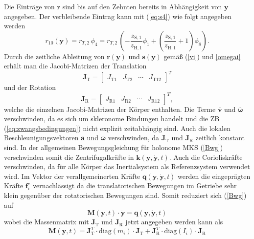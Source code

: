 Die Einträge von $\pmb{r}$ sind bis auf den Zehnten bereits in Abhängigkeit von $\pmb{y}$ angegeben. Der verbleibende Eintrag kann mit (\ref{eq:s4}) wie folgt angegeben werden
\begin{equation}
r_{10}(\pmb{y}) = r_{T,2}\,\phi_4 = r_{T,2}\,\left(-\frac{z_{\mathrm{S,1}} }{z_{\mathrm{H,1}} } \phi_1 +\left(\frac{z_{\mathrm{S,1}} }{z_{\mathrm{H,1}} }+1\right) \phi_8\right).
\end{equation}
Durch die zeitliche Ableitung von $\pmb{r}(\pmb{y})$ und $\pmb{s}(\pmb{y})$ gemäß (\ref{vi}) und \ref{omegai} erhält man die Jacobi-Matrizen der Translation
\begin{equation}
\pmb{J}_\mathrm{T} = \begin{bmatrix}
J_\mathrm{T1} & J_\mathrm{T2} & \cdots & J_\mathrm{T12}
\end{bmatrix}^T
\end{equation}  
und der Rotation 
\begin{equation}
\pmb{J}_\mathrm{R} = \begin{bmatrix}
J_\mathrm{R1} & J_\mathrm{R2} & \cdots & J_\mathrm{R12}
\end{bmatrix}^T,
\end{equation} 
welche die einzelnen Jacobi-Matrizen der Körper enthalten. Die Terme $\overline{\pmb{v}}$ und $\overline{\pmb{\omega}}$ verschwinden, da es sich um skleronome Bindungen handelt und die ZB (\ref{eq:zwangsbedingungen}) nicht explizit zeitabhängig sind. Auch die lokalen Beschleunigungsvektoren $\overline{\pmb{a}}$ und $\overline{\pmb{\omega}}$ verschwinden, da $\pmb{J}_\mathrm{T}$ und $\pmb{J}_\mathrm{R}$ zeitlich konstant sind. In der allgemeinen Bewegungsgleichung für holonome MKS (\ref{Bwg}) verschwinden somit die Zentrifugalkräfte in $\pmb{k}(\pmb{y},\dot{\pmb{y}},t)$. Auch die Corioliskräfte verschwinden, da für alle Körper das Inertialsystem als Referenzsystem verwendet wird.%
 Im Vektor der verallgemeinerten Kräfte $\pmb{q}(\pmb{y},\dot{\pmb{y}},t)$ werden die eingeprägten Kräfte $\pmb{f}^e_i$ vernachlässigt da die translatorischen Bewegungen im Getriebe sehr klein gegenüber der rotatorischen Bewegungen sind. Somit reduziert sich (\ref{Bwg}) auf
\begin{equation}
\pmb{M}(\pmb{y},t)\cdot\ddot{\pmb{y}} = \pmb{q}(\pmb{y},\dot{\pmb{y}},t)
\end{equation}
wobei die Massenmatrix mit $\pmb{J}_\mathrm{T}$ und $\pmb{J}_\mathrm{R}$ jetzt angegeben werden kann als 
  \begin{equation}
\pmb{M}(\pmb{y},t) = \pmb{J}_\mathrm{T}^T\cdot\mathrm{diag}(m_i)\cdot\pmb{J}_\mathrm{T}+\pmb{J}_\mathrm{R}^T\cdot\mathrm{diag}(I_i)\cdot\pmb{J}_\mathrm{R}
\end{equation}
